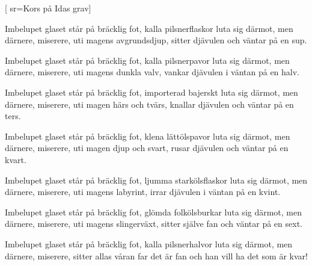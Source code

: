 [ 							
	sr={Kors på Idas grav}]		
	
\beginverse*						
Imbelupet glaset står på bräcklig fot,
kalla pilsnerflaskor luta sig därmot,
men därnere, miserere, uti magens avgrundsdjup,
sitter djävulen och väntar på en sup.
\endverse						

\beginverse				
Imbelupet glaset står på bräcklig fot,
kalla pilsnerpavor luta sig därmot,
men därnere, miserere, uti magens dunkla valv,
vankar djävulen i väntan på en halv.
\endverse				

\beginverse				
Imbelupet glaset står på bräcklig fot,
importerad bajerskt luta sig därmot,
men därnere, miserere, uti magen härs och tvärs,
knallar djävulen och väntar på en ters.
\endverse				

\beginverse				
Imbelupet glaset står på bräcklig fot,
klena lättölspavor luta sig därmot,
men därnere, miserere, uti magen djup och svart,
rusar djävulen och väntar på en kvart.
\endverse				

\beginverse				
Imbelupet glaset står på bräcklig fot,
ljumma starkölsflaskor luta sig därmot,
men därnere, miserere, uti magens labyrint,
irrar djävulen i väntan på en kvint.
\endverse				

\beginverse				
Imbelupet glaset står på bräcklig fot,
glömda folkölsburkar luta sig därmot,
men därnere, miserere, uti magens slingerväxt,
sitter själve fan och väntar på en sext.
\endverse				

\beginverse				
Imbelupet glaset står på bräcklig fot,
kalla pilsnerhalvor luta sig därmot,
men därnere, miserere, sitter allas våran far
det är fan och han vill ha det som är kvar!
\endverse				
\endsong	
